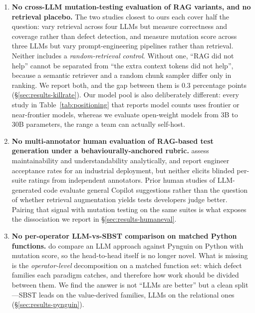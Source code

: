 \documentclass[smallextended]{svjour3}
\begin{document}
\begin{enumerate}
\item \textbf{No cross-LLM mutation-testing evaluation of RAG
 variants, and no retrieval placebo.} The two studies closest to
 ours each cover half the question: \citet{shin2026ragtest} vary
 retrieval across four LLMs but measure correctness and coverage
 rather than defect detection, and \citet{konstantinou2026newer}
 measure mutation score across three LLMs but vary
 prompt-engineering pipelines rather than retrieval. Neither
 includes a \emph{random-retrieval control}. Without one, ``RAG did
 not help'' cannot be separated from ``the extra context tokens did
 not help'', because a semantic retriever and a random chunk
 sampler differ only in ranking. We report both, and the gap
 between them is 0.3 percentage points
 (\S\ref{sec:results-killrate}). Our model pool is also
 deliberately different: every study in Table~\ref{tab:positioning}
 that reports model counts uses frontier or near-frontier models,
 whereas we evaluate open-weight models from 3B to 30B parameters,
 the range a team can actually self-host.
\item \textbf{No multi-annotator human evaluation of RAG-based test
 generation under a behaviourally-anchored rubric.}
 \citet{zhang2026refrag} assess maintainability and
 understandability analytically, and \citet{foster2025ach} report
 engineer acceptance rates for an industrial deployment, but
 neither elicits blinded per-suite ratings from independent
 annotators. Prior human studies of LLM-generated code evaluate
 general Copilot suggestions
 \citep{vaithilingam2022,liang2024copilot} rather than the question
 of whether retrieval augmentation yields tests developers judge
 better. Pairing that signal with mutation testing on the same
 suites is what exposes the dissociation we report in
 \S\ref{sec:results-humaneval}.
\item \textbf{No per-operator LLM-vs-SBST comparison on matched
 Python functions.} \citet{straubinger2025debug} do compare an
 LLM approach against Pynguin on Python with mutation score, so the
 head-to-head itself is no longer novel. What is missing is the
 \emph{operator-level} decomposition on a matched function set:
 which defect families each paradigm catches, and therefore how
 work should be divided between them. We find the answer is not
 ``LLMs are better'' but a clean split---SBST leads on the
 value-derived families, LLMs on the relational ones
 (\S\ref{sec:results-pynguin}).
\end{enumerate}
\end{document}
